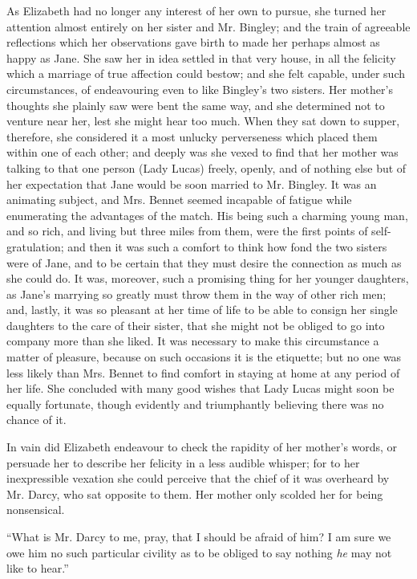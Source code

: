 \documentclass[12pt,openright]{book}
\begin{document}
As Elizabeth had no longer any interest of her own to pursue, she turned her attention almost entirely on her sister and Mr. Bingley; and the train of agreeable reflections which her observations gave birth to made her perhaps almost as happy as Jane. She saw her in idea settled in that very house, in all the felicity which a marriage of true affection could bestow; and she felt capable, under such circumstances, of endeavouring even to like Bingley’s two sisters. Her mother’s thoughts she plainly saw were bent the same way, and she determined not to venture near her, lest she might hear too much. When they sat down to supper, therefore, she considered it a most unlucky perverseness which placed them within one of each other; and deeply was she vexed to find that her mother was talking to that one person (Lady Lucas) freely, openly, and of nothing else but of her expectation that Jane would be soon married to Mr. Bingley. It was an animating subject, and Mrs. Bennet seemed incapable of fatigue while enumerating the advantages of the match. His being such a charming young man, and so rich, and living but three miles from them, were the first points of self-gratulation; and then it was such a comfort to think how fond the two sisters were of Jane, and to be certain that they must desire the connection as much as she could do. It was, moreover, such a promising thing for her younger daughters, as Jane’s marrying so greatly must throw them in the way of other rich men; and, lastly, it was so pleasant at her time of life to be able to consign her single daughters to the care of their sister, that she might not be obliged to go into company more than she liked. It was necessary to make this circumstance a matter of pleasure, because on such occasions it is the etiquette; but no one was less likely than Mrs. Bennet to find comfort in staying at home at any period of her life. She concluded with many good wishes that Lady Lucas might soon be equally fortunate, though evidently and triumphantly believing there was no chance of it.

In vain did Elizabeth endeavour to check the rapidity of her mother’s words, or persuade her to describe her felicity in a less audible whisper; for to her inexpressible vexation she could perceive that the chief of it was overheard by Mr. Darcy, who sat opposite to them. Her mother only scolded her for being nonsensical.

“What is Mr. Darcy to me, pray, that I should be afraid of him? I am sure we owe him no such particular civility as to be obliged to say nothing \textit{he} may not like to hear.”
\end{document}

